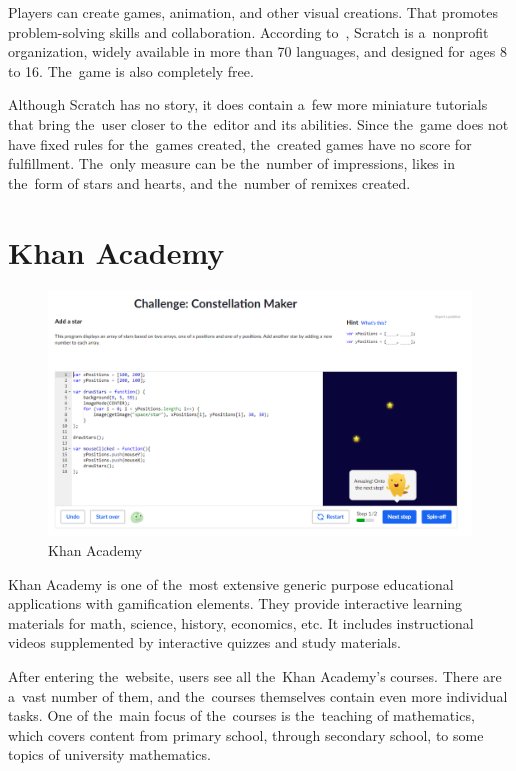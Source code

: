 \pagebreak
Players can create games, animation, and other visual creations.
That promotes problem-solving skills and collaboration.
According to~\cite{a2022_scratch}, Scratch is a~nonprofit organization, widely available in more than 70 languages, and designed for ages 8 to 16.
The~game is also completely free.

Although Scratch has no story, it does contain a~few more miniature tutorials that bring the~user closer to the~editor and its abilities.
Since the~game does not have fixed rules for the~games created, the~created games have no score for fulfillment.
The~only measure can be the~number of impressions, likes in the~form of stars and hearts, and the~number of remixes created. 

\section{Khan Academy}
\label{similar-games:khan-academy}

\begin{figure}
    \centering
    \includegraphics[width=1\linewidth]{assets/similar-games/khanacademy.png}
    \caption{Khan Academy~\cite{a2022_khan}}
    \label{fig:khanacademy}
\end{figure}

Khan Academy is one of the~most extensive generic purpose educational applications with gamification elements.
They provide interactive learning materials for math, science, history, economics, etc.
It includes instructional videos supplemented by interactive quizzes and study materials.

After entering the~website, users see all the~Khan Academy's courses.
There are a~vast number of them, and the~courses themselves contain even more individual tasks.
One of the~main focus of the~courses is the~teaching of mathematics, which covers content from primary school, through secondary school, to some topics of university mathematics.

